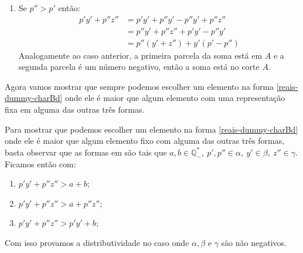 \documentclass[../main.tex]{subfiles}
\begin{document}
\begin{dem}
\begin{enumerate}
        \item Se $p'' > p'$ então:
            \begin{align*}
                p'y' + p''z'' &= p'y' + p''y' - p''y' + p''z'' \\
                &= p''y' + p''z'' + p'y' - p''y' \\
                &= p''(y'+z'') + y'(p'-p'')
            \end{align*}
            Analogamente ao caso anterior, a primeira parcela da soma está em $A$ e a segunda parcela é um número negativo, então a soma está no corte $A$.
    \end{enumerate}
    Agora vamos mostrar que sempre podemos escolher um elemento na forma \ref{reais-dummy-charBd} onde ele é maior que algum elemento com uma representação fixa em alguma das outras três formas.
    
    Para mostrar que podemos escolher um elemento na forma \ref{reais-dummy-charBd} onde ele é maior que algum elemento fixo com alguma das outras três formas, basta observar que as formas em  são tais que $a, b \in \mathbb{Q}_{-}^*,\ p',p'' \in \alpha,\ y' \in \beta,\ z'' \in \gamma$. Ficamos então com:

      \begin{enumerate}[label=(\roman*)]\label{reais-dummy-charBFormas}
        \item\label{reais-dummy-charBa} $p'y' + p''z'' > a + b $; 
        \item\label{reais-dummy-charBb} $p'y' + p''z'' > a + p''z''$; 
        \item\label{reais-dummy-charBc} $p'y' + p''z'' > p'y' + b$; 
    \end{enumerate}

    Com isso provamos a distributividade no caso onde $\alpha, \beta$ e $\gamma$ são não negativos.


\end{dem}
\end{document}

